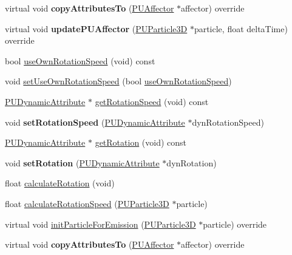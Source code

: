 \begin{DoxyCompactItemize}
\item 
\mbox{\label{classPUTextureRotator_a773af4280aaf38d385d355bf6fb02161}} 
virtual void {\bfseries copy\+Attributes\+To} (\hyperlink{classPUAffector}{P\+U\+Affector} $\ast$affector) override
\item 
\mbox{\label{classPUTextureRotator_a5fbcaf1ce923059a4e2d988e7f9d1f80}} 
virtual void {\bfseries update\+P\+U\+Affector} (\hyperlink{structPUParticle3D}{P\+U\+Particle3D} $\ast$particle, float delta\+Time) override
\item 
bool \hyperlink{classPUTextureRotator_a6438d215b7fb851bc898a4abc46b32f2}{use\+Own\+Rotation\+Speed} (void) const
\item 
void \hyperlink{classPUTextureRotator_a997bb8fc630de052732b14fdaa27943f}{set\+Use\+Own\+Rotation\+Speed} (bool \hyperlink{classPUTextureRotator_a6438d215b7fb851bc898a4abc46b32f2}{use\+Own\+Rotation\+Speed})
\item 
\hyperlink{classPUDynamicAttribute}{P\+U\+Dynamic\+Attribute} $\ast$ \hyperlink{classPUTextureRotator_a60329a29936e29a766f036d3737ca1bf}{get\+Rotation\+Speed} (void) const
\item 
\mbox{\label{classPUTextureRotator_a289238ab91afa975fcec34a2a1e4db3e}} 
void {\bfseries set\+Rotation\+Speed} (\hyperlink{classPUDynamicAttribute}{P\+U\+Dynamic\+Attribute} $\ast$dyn\+Rotation\+Speed)
\item 
\hyperlink{classPUDynamicAttribute}{P\+U\+Dynamic\+Attribute} $\ast$ \hyperlink{classPUTextureRotator_afb1a5a3c542205ca4da995ac4eff7dc2}{get\+Rotation} (void) const
\item 
\mbox{\label{classPUTextureRotator_af5894e792f088e32be17464273a1285c}} 
void {\bfseries set\+Rotation} (\hyperlink{classPUDynamicAttribute}{P\+U\+Dynamic\+Attribute} $\ast$dyn\+Rotation)
\item 
float \hyperlink{classPUTextureRotator_a0996de4263c286d134d4efb7d0c84329}{calculate\+Rotation} (void)
\item 
float \hyperlink{classPUTextureRotator_a7ffc7eb5ca88b68d6a8fc6d1ce9b8048}{calculate\+Rotation\+Speed} (\hyperlink{structPUParticle3D}{P\+U\+Particle3D} $\ast$particle)
\item 
virtual void \hyperlink{classPUTextureRotator_afec96f71b114884a9b2529c6d6eb2852}{init\+Particle\+For\+Emission} (\hyperlink{structPUParticle3D}{P\+U\+Particle3D} $\ast$particle) override
\item 
\mbox{\label{classPUTextureRotator_ac1f440c91a02631b06bee88d798f53f2}} 
virtual void {\bfseries copy\+Attributes\+To} (\hyperlink{classPUAffector}{P\+U\+Affector} $\ast$affector) override
\end{DoxyCompactItemize}
